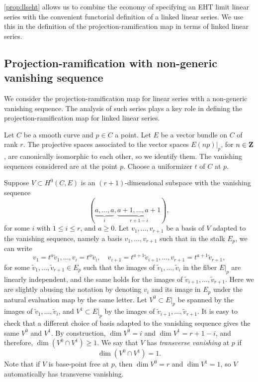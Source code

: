 \documentclass[11pt,reqno]{amsart}
\theoremstyle{plain}
\theoremstyle{definition}
\theoremstyle{remark}
\numberwithin{equation}{section}
\numberwithin{equation}{section}
\begin{document}
\autoref{prop:llseht} allows us to combine the economy of specifying an EHT limit linear series with the convenient functorial definition of a linked linear series.
We use this in the definition of the projection-ramification map in terms of linked linear series.

\subsection{Projection-ramification with non-generic vanishing sequence}
\label{sec:prnongeneric}
We consider the projection-ramification map for linear series with a non-generic vanishing sequence.
The analysis of such series plays a key role in defining the projection-ramification map for linked linear series.

Let $C$ be a smooth curve and $p \in C$ a point.
Let $E$ be a vector bundle on $C$ of rank $r$.
The projective spaces associated to the vector spaces $E(np)|_p$, for $n \in {\bf Z}$, are canonically isomorphic to each other, so we identify them.
The vanishing sequences considered are at the point $p$.
Choose a uniformizer $t$ of $C$ at $p$.

Suppose $V \subset H^0(C, E)$ is an $(r+1)$-dimensional subspace with the vanishing sequence 
\begin{equation}\label{eqn:specialvs}
  (\underbrace{a, \dots, a}_{i}, \underbrace{a+1, \dots, a+1}_{r+1-i}),
\end{equation}
for some $i$ with $1 \leq i \leq r$, and $a \geq 0$.
Let $v_1, \dots, v_{r+1}$ be a basis of $V$ adapted to the vanishing sequence, namely a basis $v_1, \dots, v_{r+1}$ such that in the stalk $E_p$, we can write
\begin{equation}\label{eqn:basis}
  v_1 = t^a \widetilde v_1, \dots, v_{i} = t^a \widetilde v_i,\quad v_{i+1} = t^{a+1} \widetilde v_{i+1}, \dots, v_{r+1} = t^{a+1} \widetilde v_{r+1},
\end{equation}
for some $\widetilde v_1, \dots, \widetilde v_{r+1} \in E_p$ such that the images of $\widetilde v_1, \dots, \widetilde v_i$ in the fiber $E|_p$ are linearly independent, and the same holds for the images of $\widetilde v_{i+1}, \dots, \widetilde v_{r+1}$.
Here we are slightly abusing the notation by denoting $v_i$ and its image in $E_p$ under the natural evaluation map by the same letter.
Let $V^0 \subset E|_p$ be spanned by the images of $\widetilde v_1, \dots, \widetilde v_i$, and $V^1 \subset E|_p$ by the images of $\widetilde v_{i+1}, \dots, \widetilde v_{r+1}$.
It is easy to check that a different choice of basis adapted to the vanishing sequence gives the same $V^0$ and $V^1$.
By construction, $\dim V^0 = i$ and $\dim V^1 = r+1-i$, and therefore, $\dim (V^0 \cap V^1) \geq 1$.
We say that $V$ has \emph{transverse vanishing} at $p$ if 
\begin{equation}\label{eq:genericity}
  \dim (V^0 \cap V^1) = 1.
\end{equation}
Note that if $V$ is base-point free at $p$, then $\dim V^0 = r$ and $\dim V^1 = 1$, so $V$ automatically has transverse vanishing.
\end{document}

